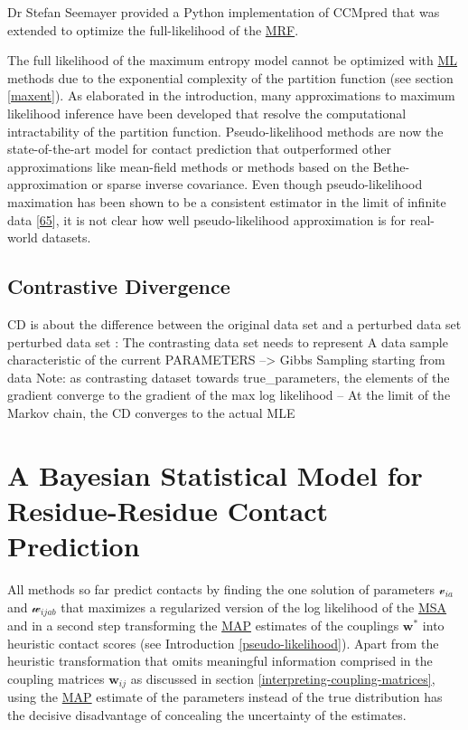 \documentclass[12pt,a4paper,twoside]{book}
\newcommand{\via}{\mathcal{v}_{ia}}
\newcommand{\w}{\mathbf{w}}
\newcommand{\wij}{\mathbf{w}_{ij}}
\newcommand{\wijab}{\mathcal{w}_{ijab}}
\theoremstyle{definition}
\theoremstyle{definition}
\theoremstyle{remark}
\begin{document}
Dr Stefan Seemayer provided a Python implementation of CCMpred that was
extended to optimize the full-likelihood of the
\protect\hyperlink{abbrev}{MRF}.

The full likelihood of the maximum entropy model cannot be optimized
with \protect\hyperlink{abbrev}{ML} methods due to the exponential
complexity of the partition function (see section \ref{maxent}). As
elaborated in the introduction, many approximations to maximum
likelihood inference have been developed that resolve the computational
intractability of the partition function. Pseudo-likelihood methods are
now the state-of-the-art model for contact prediction that outperformed
other approximations like mean-field methods or methods based on the
Bethe-approximation or sparse inverse covariance. Even though
pseudo-likelihood maximation has been shown to be a consistent estimator
in the limit of infinite data
{[}\protect\hyperlink{ref-Besag1975}{65}{]}, it is not clear how well
pseudo-likelihood approximation is for real-world datasets.

\section{Contrastive Divergence}\label{contrastive-divergence}

CD is about the difference between the original data set and a perturbed
data set perturbed data set : The contrasting data set needs to
represent A data sample characteristic of the current PARAMETERS
--\textgreater{} Gibbs Sampling starting from data Note: as contrasting
dataset towards true\_parameters, the elements of the gradient converge
to the gradient of the max log likelihood -- At the limit of the Markov
chain, the CD converges to the actual MLE

\chapter{A Bayesian Statistical Model for Residue-Residue Contact
Prediction}\label{a-bayesian-statistical-model-for-residue-residue-contact-prediction}

All methods so far predict contacts by finding the one solution of
parameters \(\via\) and \(\wijab\) that maximizes a regularized version
of the log likelihood of the \protect\hyperlink{abbrev}{MSA} and in a
second step transforming the \protect\hyperlink{abbrev}{MAP} estimates
of the couplings \(\w^*\) into heuristic contact scores (see
Introduction \ref{pseudo-likelihood}). Apart from the heuristic
transformation that omits meaningful information comprised in the
coupling matrices \(\wij\) as discussed in section
\ref{interpreting-coupling-matrices}, using the
\protect\hyperlink{abbrev}{MAP} estimate of the parameters instead of
the true distribution has the decisive disadvantage of concealing the
uncertainty of the estimates.
\end{document}
